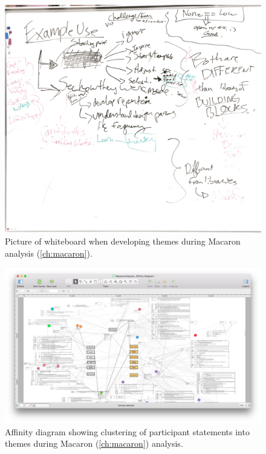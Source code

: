 	\begin{figure}[htbp] %
	   \centering
	   \includegraphics[height=\textwidth,angle=90]{Chapter99-SupportingMaterials/MethodExamples/MacaronAnalysisWhiteboard} 
	   \caption{Picture of whiteboard when developing themes during Macaron analysis (\autoref{ch:macaron}).}
	   \label{fig:SupportingMaterials:MethodExamples:MacaronAnalysisWhiteboard}
	\end{figure}
	
	
	\begin{figure}[htbp] %
	   \centering
	   \includegraphics[width=0.9\textheight,angle=90]{Chapter99-SupportingMaterials/MethodExamples/MacaronClustering} 
	   \caption{Affinity diagram showing clustering of participant statements into themes during Macaron (\autoref{ch:macaron}) analysis.}
	   \label{fig:SupportingMaterials:MethodExamples:MacaronClustering}
	\end{figure}

